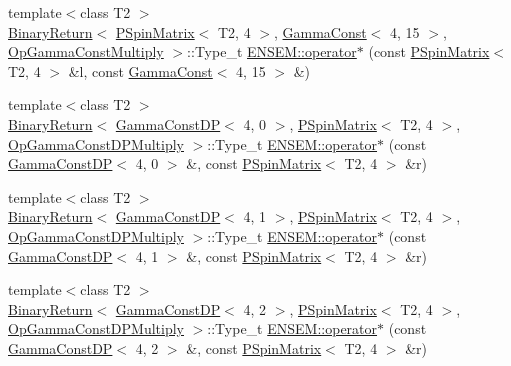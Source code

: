 \begin{DoxyCompactItemize}
\item 
{\footnotesize template$<$class T2 $>$ }\\\mbox{\hyperlink{structENSEM_1_1BinaryReturn}{Binary\+Return}}$<$ \mbox{\hyperlink{classENSEM_1_1PSpinMatrix}{P\+Spin\+Matrix}}$<$ T2, 4 $>$, \mbox{\hyperlink{classENSEM_1_1GammaConst}{Gamma\+Const}}$<$ 4, 15 $>$, \mbox{\hyperlink{structENSEM_1_1OpGammaConstMultiply}{Op\+Gamma\+Const\+Multiply}} $>$\+::Type\+\_\+t \mbox{\hyperlink{group__primspinmatrix_ga155437c338ef3cef89bff41046cde747}{E\+N\+S\+E\+M\+::operator$\ast$}} (const \mbox{\hyperlink{classENSEM_1_1PSpinMatrix}{P\+Spin\+Matrix}}$<$ T2, 4 $>$ \&l, const \mbox{\hyperlink{classENSEM_1_1GammaConst}{Gamma\+Const}}$<$ 4, 15 $>$ \&)
\item 
{\footnotesize template$<$class T2 $>$ }\\\mbox{\hyperlink{structENSEM_1_1BinaryReturn}{Binary\+Return}}$<$ \mbox{\hyperlink{classENSEM_1_1GammaConstDP}{Gamma\+Const\+DP}}$<$ 4, 0 $>$, \mbox{\hyperlink{classENSEM_1_1PSpinMatrix}{P\+Spin\+Matrix}}$<$ T2, 4 $>$, \mbox{\hyperlink{structENSEM_1_1OpGammaConstDPMultiply}{Op\+Gamma\+Const\+D\+P\+Multiply}} $>$\+::Type\+\_\+t \mbox{\hyperlink{group__primspinmatrix_ga48316ae1067c59ec664fcd1c4d26042a}{E\+N\+S\+E\+M\+::operator$\ast$}} (const \mbox{\hyperlink{classENSEM_1_1GammaConstDP}{Gamma\+Const\+DP}}$<$ 4, 0 $>$ \&, const \mbox{\hyperlink{classENSEM_1_1PSpinMatrix}{P\+Spin\+Matrix}}$<$ T2, 4 $>$ \&r)
\item 
{\footnotesize template$<$class T2 $>$ }\\\mbox{\hyperlink{structENSEM_1_1BinaryReturn}{Binary\+Return}}$<$ \mbox{\hyperlink{classENSEM_1_1GammaConstDP}{Gamma\+Const\+DP}}$<$ 4, 1 $>$, \mbox{\hyperlink{classENSEM_1_1PSpinMatrix}{P\+Spin\+Matrix}}$<$ T2, 4 $>$, \mbox{\hyperlink{structENSEM_1_1OpGammaConstDPMultiply}{Op\+Gamma\+Const\+D\+P\+Multiply}} $>$\+::Type\+\_\+t \mbox{\hyperlink{group__primspinmatrix_gaa16aa59946d908b7254dc099e2518fc0}{E\+N\+S\+E\+M\+::operator$\ast$}} (const \mbox{\hyperlink{classENSEM_1_1GammaConstDP}{Gamma\+Const\+DP}}$<$ 4, 1 $>$ \&, const \mbox{\hyperlink{classENSEM_1_1PSpinMatrix}{P\+Spin\+Matrix}}$<$ T2, 4 $>$ \&r)
\item 
{\footnotesize template$<$class T2 $>$ }\\\mbox{\hyperlink{structENSEM_1_1BinaryReturn}{Binary\+Return}}$<$ \mbox{\hyperlink{classENSEM_1_1GammaConstDP}{Gamma\+Const\+DP}}$<$ 4, 2 $>$, \mbox{\hyperlink{classENSEM_1_1PSpinMatrix}{P\+Spin\+Matrix}}$<$ T2, 4 $>$, \mbox{\hyperlink{structENSEM_1_1OpGammaConstDPMultiply}{Op\+Gamma\+Const\+D\+P\+Multiply}} $>$\+::Type\+\_\+t \mbox{\hyperlink{group__primspinmatrix_gaa8e0559c55ac9cff30b9407943afea03}{E\+N\+S\+E\+M\+::operator$\ast$}} (const \mbox{\hyperlink{classENSEM_1_1GammaConstDP}{Gamma\+Const\+DP}}$<$ 4, 2 $>$ \&, const \mbox{\hyperlink{classENSEM_1_1PSpinMatrix}{P\+Spin\+Matrix}}$<$ T2, 4 $>$ \&r)

\end{DoxyCompactItemize}
